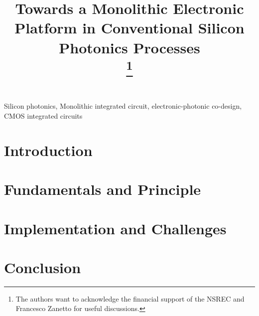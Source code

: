 \documentclass[conference]{IEEEtran}
\begin{document}
\title{Towards a Monolithic Electronic Platform in Conventional Silicon Photonics Processes\\
\thanks{The authors want to acknowledge the financial support of the NSREC and Francesco Zanetto for useful discussions.}
}
\author{
}

\newcommand{\CitationNeeded}{\textcolor{red}{\setlength{\fboxsep}{1pt}\colorbox{yellow}{[citation needed]}}}

\maketitle

\begin{abstract}

\end{abstract}

\begin{IEEEkeywords}
Silicon photonics, Monolithic integrated circuit, electronic-photonic co-design, CMOS integrated circuits
\end{IEEEkeywords}

\section{Introduction}


\section{Fundamentals and Principle}


\section{Implementation and Challenges}


\section{Conclusion}



\end{document}
